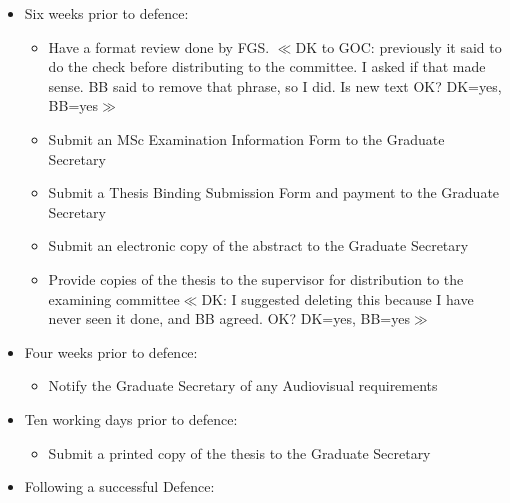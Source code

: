 \documentclass[12pt]{article}
\newcommand{\vote}[1]{\color{voteColor}$\ll$#1$\gg$\color{black}\marginpar[$\gg$ vote]{$\ll$ vote}\index{$>>>>$VOTE$<<<<$}}
\newcommand{\supervisor}{supervisor\xspace}
\newcommand{\GS}{Graduate Secretary\xspace}
\newcommand{\FGS}{FGS\xspace}
\begin{document}
\begin{itemize}
    \item Six weeks prior to defence:

        \begin{itemize}

            \item Have a format review done by \FGS. \vote{DK to GOC:
                previously it said to do the check before distributing to the
                committee. I asked if that made sense. BB said to remove that
                phrase, so I did. Is new text OK? DK=yes, BB=yes}

            \item Submit an MSc Examination Information Form to the \GS

            \item Submit a Thesis Binding Submission Form and payment to the
                \GS

            \item Submit an electronic copy of the abstract to the Graduate
                Secretary

            \item Provide copies of the thesis to the \supervisor for
                distribution to the examining committee\vote{DK: I suggested
                deleting this because I have never seen it done, and BB agreed.
                OK? DK=yes, BB=yes}

        \end{itemize}

    \item Four weeks prior to defence:

        \begin{itemize}

            \item Notify the \GS of any Audiovisual requirements

        \end{itemize}

    \item Ten working days prior to defence:
        \begin{itemize}

            \item Submit a printed copy of the thesis to the \GS

        \end{itemize}

    \item Following a successful Defence:


\end{itemize}
\end{document}
